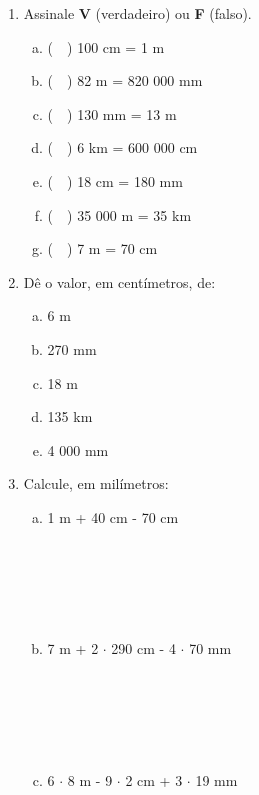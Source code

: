 \documentclass[a4paper,14pt]{article}
\begin{document}
\begin{multicols}{2}
\begin{enumerate}
			\item Assinale \textbf{V} (verdadeiro) ou \textbf{F} (falso).
			\begin{enumerate}[a)]
				\item (~~) 100 cm = 1 m
				\item (~~) 82 m = 820 000 mm
				\item (~~) 130 mm = 13 m
				\item (~~) 6 km = 600 000 cm
				\item (~~) 18 cm = 180 mm
				\item (~~) 35 000 m = 35 km
				\item (~~) 7 m = 70 cm
			\end{enumerate}
			\item Dê o valor, em centímetros, de:
			\begin{enumerate}[a)]
				\item 6 m
				\item 270 mm
				\item 18 m
				\item 135 km
				\item 4 000 mm \newpage
			\end{enumerate}
			\item Calcule, em milímetros:
			\begin{enumerate}[a)]
				\item 1 m + 40 cm - 70 cm \\\\\\\\\\\\
				\item 7 m + 2 $\cdot$ 290 cm - 4 $\cdot$ 70 mm  \\\\\\\\\\\\
				\item 6 $\cdot$ 8 m - 9 $\cdot$ 2 cm + 3 $\cdot$ 19 mm  \\\\\\\\\\\\\\\\\\\\\\\\\\\\\\\\\\\\\\\\\\\\\\

\end{enumerate}
\end{enumerate}
\end{multicols}
\end{document}
